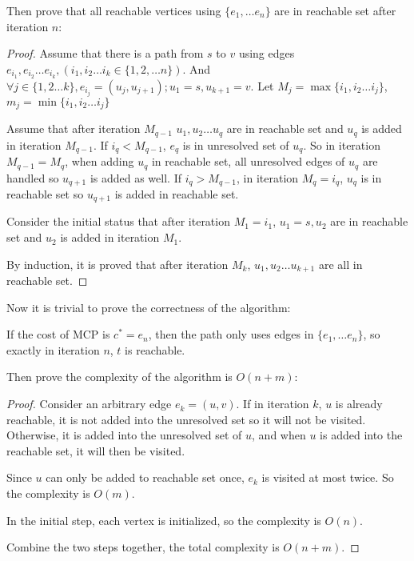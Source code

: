     \bigskip

    Then prove that all reachable vertices using $\{e_1,\dots e_n\}$ are in reachable set after iteration $n$: 
    \begin{proof}[Proof]
        Assume that there is a path from $s$ to $v$ using edges $e_{i_1},e_{i_2}\dots e_{i_k},(i_1,i_2\dots i_k\in \{1,2,\dots n\})$. 
        And $\forall j\in \{1,2\dots k\},e_{i_j}=(u_j,u_{j+1});u_1=s,u_{k+1}=v$. 
        Let $M_j=\max\{i_1,i_2\dots i_j\}$, $m_j=\min\{i_1,i_2\dots i_j\}$

        Assume that after iteration $M_{q-1}$ $u_1,u_2\dots u_q$ are in reachable set and $u_q$ is added in iteration $M_{q-1}$. 
        If $i_q<M_{q-1}$, $e_q$ is in unresolved set of $u_q$. 
        So in iteration $M_{q-1}=M_q$, when adding $u_q$ in reachable set, 
        all unresolved edges of $u_q$ are handled so $u_{q+1}$ is added as well. 
        If $i_q>M_{q-1}$, in iteration $M_q=i_q$, $u_q$ is in reachable set so $u_{q+1}$ is added in reachable set. 

        Consider the initial status that after iteration $M_1=i_1$, $u_1=s,u_2$ are in reachable set and $u_2$ is added in iteration $M_1$. 

        By induction, it is proved that after iteration $M_k$, $u_1,u_2\dots u_{k+1}$ are all in reachable set. 
    \end{proof}

    \bigskip
    
    
        Now it is trivial to prove the correctness of the algorithm: 
        
        If the cost of MCP is $c^*=e_n$, then the path only uses edges in $\{e_1,\dots e_n\}$, so exactly in iteration $n$, $t$ is reachable. 

        Then prove the complexity of the algorithm is $O(n+m)$:
    \begin{proof}[Proof]
        Consider an arbitrary edge $e_k=(u,v)$. If in iteration $k$, $u$ is already reachable, 
        it is not added into the unresolved set so it will not be visited. 
        Otherwise, it is added into the unresolved set of $u$, 
        and when $u$ is added into the reachable set, it will then be visited. 

        Since $u$ can only be added to reachable set once, $e_k$ is visited at most twice. So the complexity is $O(m)$.

        In the initial step, each vertex is initialized, so the complexity is $O(n)$. 

        Combine the two steps together, the total complexity is $O(n+m)$. 
    \end{proof} 



